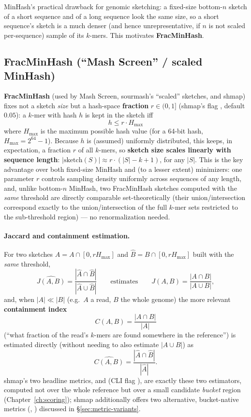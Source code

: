 MinHash's practical drawback for genomic sketching: a fixed-size bottom-$n$ sketch of a short
sequence and of a long sequence look the same size, so a short sequence's sketch is a much denser
(and hence unrepresentative, if $n$ is not scaled per-sequence) sample of its $k$-mers. This
motivates \textbf{FracMinHash}.

\subsection{FracMinHash (``Mash Screen'' / scaled MinHash)}
\label{sec:fracminhash-theory}

\textbf{FracMinHash} (used by Mash Screen, sourmash's ``scaled'' sketches, and shmap) fixes not a
sketch \emph{size} but a hash-space \textbf{fraction} $r \in (0,1]$ (shmap's flag ,
default $0.05$): a $k$-mer with hash $h$ is kept in the sketch iff
\[
  h \le r \cdot H_{\max}
\]
where $H_{\max}$ is the maximum possible hash value (for a 64-bit hash, $H_{\max}=2^{64}-1$).
Because $h$ is (assumed) uniformly distributed, this keeps, in expectation, a fraction $r$ of all
$k$-mers, so \textbf{sketch size scales linearly with sequence length}: $|\text{sketch}(S)|
\approx r\cdot(|S|-k+1)$, for any $|S|$. This is the key advantage over both fixed-size MinHash
and (to a lesser extent) minimizers: one parameter $r$ controls sampling density uniformly across
sequences of any length, and, unlike bottom-$n$ MinHash, two FracMinHash sketches computed with
the \emph{same} threshold are directly comparable set-theoretically (their union/intersection
correspond exactly to the union/intersection of the full $k$-mer sets restricted to the
sub-threshold region) --- no renormalization needed.

\paragraph{Jaccard and containment estimation.} For two sketches $\hat A = A \cap [0, rH_{\max}]$
and $\hat B = B \cap [0, rH_{\max}]$ built with the \emph{same} threshold,
\[
  \widehat{J(A,B)} = \frac{|\hat A \cap \hat B|}{|\hat A \cup \hat B|}
  \qquad\text{estimates}\qquad
  J(A,B)=\frac{|A\cap B|}{|A \cup B|},
\]
and, when $|A| \ll |B|$ (e.g.\ $A$ a read, $B$ the whole genome) the more relevant
\textbf{containment index}
\[
  C(A, B) = \frac{|A \cap B|}{|A|}
\]
(``what fraction of the read's $k$-mers are found somewhere in the reference'') is estimated
directly (without needing to also estimate $|A \cup B|$) as
\[
  \widehat{C(A,B)} = \frac{|\hat A \cap \hat B|}{|\hat A|}.
\]
shmap's two headline metrics,  and  (CLI flag ), are
exactly these two estimators, computed not over the whole reference but over a small candidate
\emph{bucket} region (Chapter~\ref{ch:scoring}); shmap additionally offers two alternative,
bucket-native metrics (, ) discussed in
\S\ref{sec:metric-variants}.

